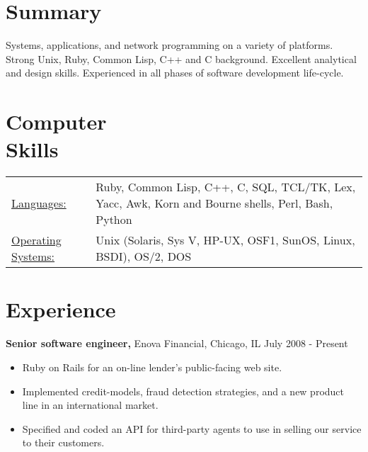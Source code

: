 \documentclass[margin]{res}
\begin{document}
 
 
 
\address{{\bf Home Address} \\ 2446 North Albany Avenue \\ Chicago, IL 60647-2602  \\
        (773) 627-2020 }
\address{{\bf Email Address} \\ craig.ludington@rimpoche.chi.il.us }

 
\begin{resume} 
 
\section{Summary} 
Systems, applications, and network programming on a variety of platforms.
Strong Unix, Ruby, Common Lisp, C++ and  C background.
Excellent analytical and design skills.
Experienced in all phases of software development life-cycle.

\section{Computer \\ Skills}
   \begin{tabular}{l p{3in}}
    \underline{Languages:} & Ruby, Common Lisp, C++, C, SQL, TCL/TK, Lex, Yacc, Awk, Korn and Bourne shells, Perl, Bash, Python \\
     \underline{Operating Systems:} & Unix (Solaris, Sys V, HP-UX, OSF1, SunOS, Linux, BSDI), OS/2, DOS
 \end{tabular}


\section{Experience}
 {\bf Senior software engineer,} Enova Financial, Chicago, IL \hfill July 2008 - Present
\begin{itemize} \itemsep -2pt %
\item Ruby on Rails for an on-line lender's public-facing web site. 
\item Implemented credit-models, fraud detection strategies, and a new product line in an international market.
\item Specified and coded an API for third-party agents to use in selling our service to their customers.
\end{itemize}




\end{resume}
\end{document}
